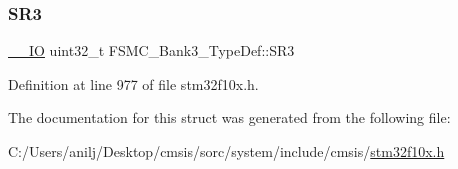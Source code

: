 \subsubsection{\texorpdfstring{S\+R3}{SR3}}
{\footnotesize\ttfamily \hyperlink{core__sc300_8h_aec43007d9998a0a0e01faede4133d6be}{\+\_\+\+\_\+\+IO} uint32\+\_\+t F\+S\+M\+C\+\_\+\+Bank3\+\_\+\+Type\+Def\+::\+S\+R3}



Definition at line 977 of file stm32f10x.\+h.



The documentation for this struct was generated from the following file\+:\begin{DoxyCompactItemize}
\item 
C\+:/\+Users/anilj/\+Desktop/cmsis/sorc/system/include/cmsis/\hyperlink{stm32f10x_8h}{stm32f10x.\+h}\end{DoxyCompactItemize}
